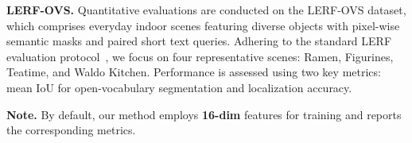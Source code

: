 \noindent\textbf{LERF-OVS.} Quantitative evaluations are conducted on the LERF-OVS dataset, which comprises everyday indoor scenes featuring diverse objects with pixel-wise semantic masks and paired short text queries. Adhering to the standard LERF evaluation protocol~\cite{lerf2023}, we focus on four representative scenes: Ramen, Figurines, Teatime, and Waldo Kitchen. Performance is assessed using two key metrics: mean IoU for open-vocabulary segmentation and localization accuracy.




\noindent\textbf{Note.} By default, our method employs \textbf{16-dim} features for training and reports the corresponding metrics.
